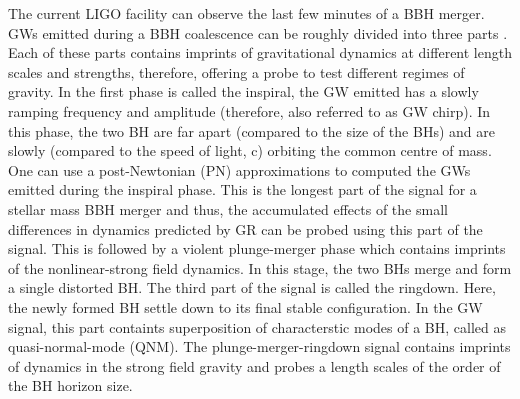 The current LIGO facility can observe the last few minutes of a BBH merger. GWs emitted during a BBH coalescence can be roughly divided into three parts \cite{JCreightonBook}. Each of these parts contains imprints of gravitational dynamics at different length scales and strengths, therefore, offering a probe to test different regimes of gravity.  In the first phase is called the inspiral, the GW emitted has a slowly ramping frequency and amplitude (therefore, also referred to as GW chirp). In this phase, the two BH are far apart (compared to the size of the BHs) and are slowly (compared to the speed of light, c)  orbiting the common centre of mass. One can use a post-Newtonian (PN) approximations to computed the GWs emitted during the inspiral phase. This is the longest part of the signal for a stellar mass BBH merger and thus, the accumulated effects of the small differences in dynamics predicted by GR can be probed using this part of the signal.   This is followed by a violent plunge-merger phase which contains imprints of the nonlinear-strong field dynamics. In this stage, the two BHs merge and form a single distorted BH. The third part of the signal is called the ringdown.  Here, the newly formed BH settle down to its final stable configuration. In the GW signal, this part containts superposition of characterstic modes of a BH, called as quasi-normal-mode (QNM). The plunge-merger-ringdown signal contains imprints of dynamics in the strong field gravity and probes a length scales of the order of the BH horizon size.  




